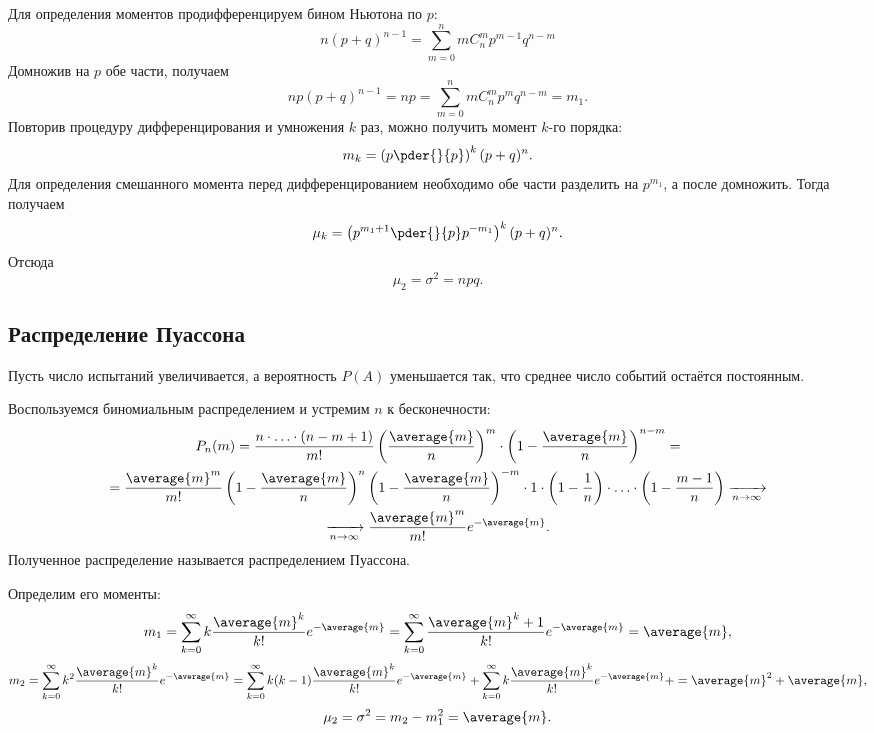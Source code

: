     Для определения моментов продифференцируем бином Ньютона по \( p \):
    \[
        n(p+q)^{n-1} = \sum_{m=0}^n m C_n^m p^{m-1} q^{n-m}
    \]
    Домножив на \( p \) обе части, получаем
    \[
        np(p+q)^{n-1} = np = \sum_{m=0}^n m C_n^m p^m q^{n-m} = m_1.
    \]
    Повторив процедуру дифференцирования и умножения \( k \) раз, можно получить
    момент \( k \)-го порядка:
    \[
        m_k = \left( p \pder{}{p} \right)^k (p+q)^n.
    \]
    Для определения смешанного момента перед дифференцированием необходимо обе
    части разделить на \( p^{m_1} \), а после домножить. Тогда получаем
    \[
        \mu_k = \left( p^{m_1+1} \pder{}{p} p^{-m_1} \right)^k (p+q)^n.
    \]
    Отсюда
    \[
        \mu_2 = \sigma^2 = npq.
    \]

\subsection{Распределение Пуассона}

    Пусть число испытаний увеличивается, а вероятность \( P(A) \) уменьшается
    так, что среднее число событий остаётся постоянным.

    Воспользуемся биномиальным распределением и устремим \( n \) к
    бесконечности:
    \begin{gather*}
        P_n(m) = \frac{n\cdot\ldots\cdot(n-m+1)}{m!}
        \left(\frac{\average{m}}{n}\right)^m\cdot
        \left(1 - \frac{\average{m}}{n}\right)^{n-m} =\\
        =\frac{\average{m}^m}{m!}\left(1 - \frac{\average{m}}{n}\right)^n
        \left(1 - \frac{\average{m}}{n}\right)^{-m} \cdot 1 \cdot
        \left(1 - \frac{1}{n}\right)\cdot\ldots\cdot
        \left(1 - \frac{m-1}{n}\right) \xrightarrow[n\to\infty]{}\\
        \xrightarrow[n\to\infty]{} \frac{\average{m}^m}{m!}e^{-\average{m}}.
    \end{gather*}
    Полученное распределение называется распределением Пуассона.

    Определим его моменты:
    \[
        m_1 = \sum_{k=0}^\infty k\frac{\average{m}^k}{k!}e^{-\average{m}} =
        \sum_{k=0}^\infty \frac{\average{m}^k+1}{k!}e^{-\average{m}} =
        \average{m},
    \]
    \[
        m_2 = \sum_{k=0}^\infty k^2\frac{\average{m}^k}{k!}e^{-\average{m}} =
        \sum_{k=0}^\infty k(k-1)\frac{\average{m}^k}{k!}e^{-\average{m}} +
        \sum_{k=0}^\infty k\frac{\average{m}^k}{k!}e^{-\average{m}} +
        = \average{m}^2 + \average{m},
    \]
    \[
        \mu_2 = \sigma^2 = m_2 - m_1^2 = \average{m}.
    \]


